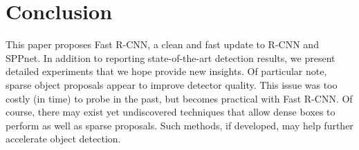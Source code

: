 \section{Conclusion}

This paper proposes Fast R-CNN, a clean and fast update to R-CNN and SPPnet.
In addition to reporting state-of-the-art detection results, we present detailed experiments that we hope provide new insights.
Of particular note, sparse object proposals appear to improve detector quality.
This issue was too costly (in time) to probe in the past, but becomes practical with Fast R-CNN.
Of course, there may exist yet undiscovered techniques that allow dense boxes to perform as well as sparse proposals.
Such methods, if developed, may help further accelerate object detection.
